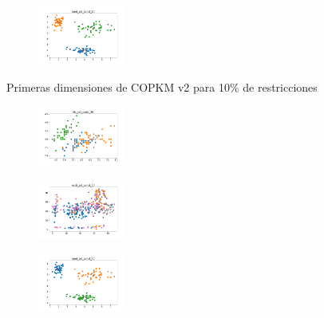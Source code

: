 \begin{figure}[H]
\begin{subfigure}
    \end{subfigure}
    \hfill
    \begin{subfigure}
        \centering
        \includegraphics[width=0.32\textwidth]{img/copkm2/rand_set_const_10_3773969821_clust.png}
    \end{subfigure}
    \caption{Primeras dimensiones de COPKM v2 para 10\% de restricciones}
\end{figure}

\newpage

\begin{figure}[H]    
    \centering
    \begin{subfigure}
        \centering
        \includegraphics[width=0.32\textwidth]{img/copkm2/iris_set_const_20_949004259_clust.png}
    \end{subfigure}
    \hfill
    \begin{subfigure}
        \centering
        \includegraphics[width=0.32\textwidth]{img/copkm2/ecoli_set_const_20_949004259_clust.png}
    \end{subfigure}
    \hfill
    \begin{subfigure}
        \centering
        \includegraphics[width=0.32\textwidth]{img/copkm2/rand_set_const_20_949004259_clust.png}
    \end{subfigure}

\end{figure}
